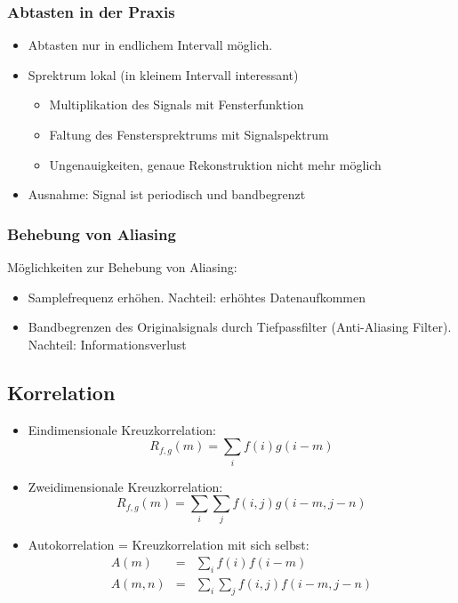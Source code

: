 \subsubsection*{Abtasten in der Praxis}
\begin{itemize}
\item Abtasten nur in endlichem Intervall möglich.
\item Sprektrum lokal (in kleinem Intervall interessant)
\begin{itemize}
\item Multiplikation des Signals mit Fensterfunktion
\item Faltung des Fenstersprektrums mit Signalspektrum
\item Ungenauigkeiten, genaue Rekonstruktion nicht mehr möglich
\end{itemize}
\item Ausnahme: Signal ist periodisch und bandbegrenzt
\end{itemize}

\subsubsection*{Behebung von Aliasing}
Möglichkeiten zur Behebung von Aliasing:
\begin{itemize}
\item Samplefrequenz erhöhen. Nachteil: erhöhtes Datenaufkommen
\item Bandbegrenzen des Originalsignals durch Tiefpassfilter (Anti-Aliasing Filter). Nachteil: Informationsverlust
\end{itemize}

\subsection{Korrelation}
\begin{itemize}
\item Eindimensionale Kreuzkorrelation: $$R_{f,g}(m) = \sum\limits_{i} f(i) g(i - m)$$
\item Zweidimensionale Kreuzkorrelation: $$R_{f,g}(m) = \sum\limits_i \sum\limits_j f(i,j) g(i-m,j-n)$$
\item Autokorrelation = Kreuzkorrelation mit sich selbst:
\begin{eqnarray*}
A(m) &=& \sum\limits_i f(i) f(i-m) \\ A(m,n) &=& \sum\limits_i \sum\limits_j f(i,j) f(i-m,j-n)
\end{eqnarray*}
\end{itemize}


